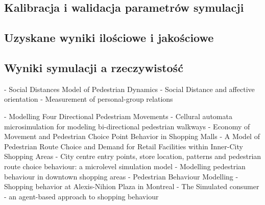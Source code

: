 \documentclass[a4paper, 12pt]{article}
\begin{document}
        \subsection{Kalibracja i walidacja parametrów symulacji}
        \label{sec:p}


        \subsection{Uzyskane wyniki ilościowe i jakościowe}
        \label{sec:results}


        \subsection{Wyniki symulacji a rzeczywistość}
        \label{sec:sim-vs-reality}


\newpage
    \begin{thebibliography}{9}
        \label{sec:refs}

         - Social Distances Model of Pedestrian Dynamics
         - Social Distance and affective orientation
         - Measurement of personal-group relations

         - Modelling Four Directional Pedestriam Movements
         - Cellural automata microsimulation for modeling bi-directional pedestrian walkways
         - Economy of Movement and Pedestrian Choice Point Behavior in Shopping Malls
         - A Model of Pedestrian Route Choice and Demand for Retail Facilities within Inner-City Shopping Areas
         - City centre entry points, store location, patterns and pedestrian route choice behaviour: a microlevel simulation model
         - Modelling pedestrian behaviour in downtown shopping areas
         - Pedestrian Behaviour Modelling
         - Shopping behavior at Alexis-Nihion Plaza in Montreal
         - The Simulated consumer - an agent-based approach to shopping behaviour
    \end{thebibliography}
\end{document}
